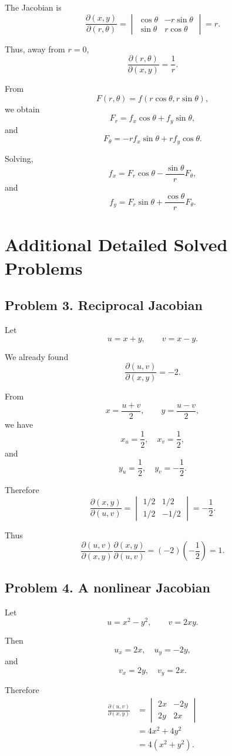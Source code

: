 \documentclass[11pt,oneside]{book}
\theoremstyle{studentthm}
\theoremstyle{definition}
\begin{document}
The Jacobian is
\[
\frac{\partial(x,y)}{\partial(r,\theta)}
=
\begin{vmatrix}
\cos\theta&-r\sin\theta\\
\sin\theta&r\cos\theta
\end{vmatrix}
=r.
\]

Thus, away from \(r=0\),
\[
\frac{\partial(r,\theta)}{\partial(x,y)}
=
\frac1r.
\]

From
\[
F(r,\theta)
=
f(r\cos\theta,r\sin\theta),
\]
we obtain
\[
F_r=f_x\cos\theta+f_y\sin\theta,
\]
and
\[
F_\theta
=
-rf_x\sin\theta
+
rf_y\cos\theta.
\]

Solving,
\[
f_x
=
F_r\cos\theta
-
\frac{\sin\theta}{r}F_\theta,
\]
and
\[
f_y
=
F_r\sin\theta
+
\frac{\cos\theta}{r}F_\theta.
\]

\section{Additional Detailed Solved Problems}

\subsection*{Problem 3. Reciprocal Jacobian}

Let
\[
u=x+y,\qquad v=x-y.
\]

We already found
\[
\frac{\partial(u,v)}{\partial(x,y)}
=-2.
\]

From
\[
x=\frac{u+v}{2},
\qquad
y=\frac{u-v}{2},
\]
we have
\[
x_u=\frac12,\quad x_v=\frac12,
\]
and
\[
y_u=\frac12,\quad y_v=-\frac12.
\]

Therefore
\[
\frac{\partial(x,y)}{\partial(u,v)}
=
\begin{vmatrix}
1/2&1/2\\
1/2&-1/2
\end{vmatrix}
=
-\frac12.
\]

Thus
\[
\frac{\partial(u,v)}{\partial(x,y)}
\frac{\partial(x,y)}{\partial(u,v)}
=
(-2)\left(-\frac12\right)
=1.
\]

\subsection*{Problem 4. A nonlinear Jacobian}

Let
\[
u=x^2-y^2,
\qquad
v=2xy.
\]

Then
\[
u_x=2x,\quad u_y=-2y,
\]
and
\[
v_x=2y,\quad v_y=2x.
\]

Therefore
\[
\begin{aligned}
\frac{\partial(u,v)}{\partial(x,y)}
&=
\begin{vmatrix}
2x&-2y\\
2y&2x
\end{vmatrix}\\
&=
4x^2+4y^2\\
&=
4(x^2+y^2).
\end{aligned}
\]
\end{document}
